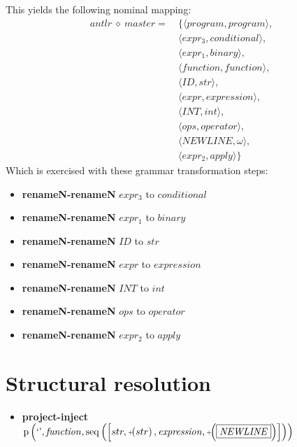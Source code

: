 This yields the following nominal mapping:
\begin{align*}\mathit{antlr} \:\diamond\: \mathit{master} =\:& \{\langle \mathit{program},\mathit{program}\rangle,\\
 & \langle \mathit{expr_3},\mathit{conditional}\rangle,\\
 & \langle \mathit{expr_1},\mathit{binary}\rangle,\\
 & \langle \mathit{function},\mathit{function}\rangle,\\
 & \langle \mathit{ID},str\rangle,\\
 & \langle \mathit{expr},\mathit{expression}\rangle,\\
 & \langle \mathit{INT},int\rangle,\\
 & \langle \mathit{ops},\mathit{operator}\rangle,\\
 & \langle \mathit{NEWLINE},\omega\rangle,\\
 & \langle \mathit{expr_2},\mathit{apply}\rangle\}\end{align*}
 Which is exercised with these grammar transformation steps:

{\footnotesize\begin{itemize}
\item \textbf{renameN-renameN} $\mathit{expr_3}$ to $\mathit{conditional}$
\item \textbf{renameN-renameN} $\mathit{expr_1}$ to $\mathit{binary}$
\item \textbf{renameN-renameN} $\mathit{ID}$ to $str$
\item \textbf{renameN-renameN} $\mathit{expr}$ to $\mathit{expression}$
\item \textbf{renameN-renameN} $\mathit{INT}$ to $int$
\item \textbf{renameN-renameN} $\mathit{ops}$ to $\mathit{operator}$
\item \textbf{renameN-renameN} $\mathit{expr_2}$ to $\mathit{apply}$
\end{itemize}}

\section{Structural resolution}
{\footnotesize\begin{itemize}
\item \textbf{project-inject}\\$\mathrm{p}\left(\text{`'},\mathit{function},\mathrm{seq}\left(\left[str, \plus \left(str\right), \mathit{expression}, \plus \left(\fbox{$\mathit{NEWLINE}$}\right)\right]\right)\right)$
\end{itemize}}
